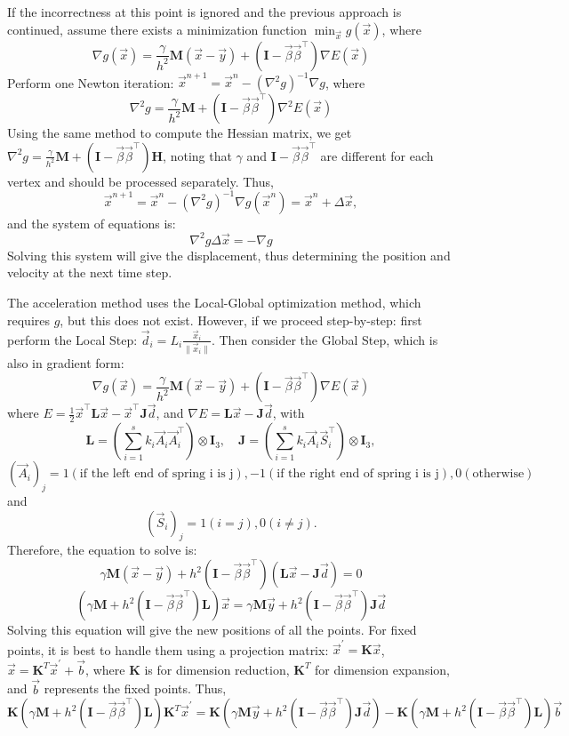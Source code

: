 \documentclass{article}
\begin{document}
If the incorrectness at this point is ignored and the previous approach is continued, assume there exists a minimization function $\min_{\vec{x}} g(\vec{x})$, where
$$ \nabla g(\vec{x}) = \frac{\gamma}{h^2} \mathbf{M}(\vec{x} - \vec{y}) + (\mathbf{I} - \vec{\beta} \vec{\beta}^\top) \nabla E(\vec{x}) $$
Perform one Newton iteration: $ \vec{x}^{n+1} = \vec{x}^n - (\nabla^2 g)^{-1} \nabla g $, where
$$ \nabla^2 g = \frac{\gamma}{h^2} \mathbf{M} + (\mathbf{I} - \vec{\beta} \vec{\beta}^\top) \nabla^2 E(\vec{x}) $$
Using the same method to compute the Hessian matrix, we get $ \nabla^2 g = \frac{\gamma}{h^2} \mathbf{M} + (\mathbf{I} - \vec{\beta} \vec{\beta}^\top) \mathbf{H} $, noting that $\gamma$ and $\mathbf{I} - \vec{\beta} \vec{\beta}^\top$ are different for each vertex and should be processed separately.
Thus, 
$$ \vec{x}^{n+1} = \vec{x}^n - (\nabla^2 g)^{-1} \nabla g (\vec{x}^n) = \vec{x}^n + \Delta \vec{x}, $$
and the system of equations is:
$$ \nabla^2 g \Delta \vec{x} = -\nabla g $$
Solving this system will give the displacement, thus determining the position and velocity at the next time step.

The acceleration method uses the Local-Global optimization method, which requires $g$, but this does not exist. However, if we proceed step-by-step: first perform the Local Step: $ \vec{d}_i = L_i \frac{\vec{x}_i}{\|\vec{x}_i \|} $. Then consider the Global Step, which is also in gradient form:
$$ \nabla g(\vec{x}) = \frac{\gamma}{h^2} \mathbf{M}(\vec{x} - \vec{y}) + (\mathbf{I} - \vec{\beta} \vec{\beta}^\top) \nabla E(\vec{x}) $$
where $E = \frac{1}{2} \vec{x}^\top \mathbf{L}\vec{x} - \vec{x}^\top \mathbf{J} \vec{d} $, and $\nabla E = \mathbf{L} \vec{x} - \mathbf{J} \vec{d}$, with 
$$ \mathbf{L}=\left(\sum_{i=1}^s k_i \vec{A} _ i \vec{A} _ i^{\top}\right) \otimes \mathbf{I} _ 3, \quad \mathbf{J}=\left(\sum_{i=1}^s k_i \vec{A}_i \vec{S}_i^{\top}\right) \otimes \mathbf{I}_3, $$
$$ (\vec{A}_i)_j = 1 (\text{if the left end of spring i is j}), -1 (\text{if the right end of spring i is j}), 0 (\text{otherwise}) $$
and
$$ (\vec{S}_i)_j = 1 (i = j), 0 (i \neq j). $$
Therefore, the equation to solve is:
$$ \gamma \mathbf{M}(\vec{x} - \vec{y}) + h^2 (\mathbf{I} - \vec{\beta} \vec{\beta}^\top) (\mathbf{L} \vec{x} - \mathbf{J} \vec{d}) = 0 $$
$$ (\gamma \mathbf{M} + h^2 (\mathbf{I} - \vec{\beta} \vec{\beta}^\top) \mathbf{L}) \vec{x} = \gamma \mathbf{M} \vec{y} + h^2 (\mathbf{I} - \vec{\beta} \vec{\beta}^\top) \mathbf{J} \vec{d} $$
Solving this equation will give the new positions of all the points. For fixed points, it is best to handle them using a projection matrix: $\vec{x}^{'} = \mathbf{K} \vec{x}$, $\vec{x} = \mathbf{K}^{T} \vec{x}^{'} + \vec{b}$, where $\mathbf{K}$ is for dimension reduction, $\mathbf{K}^{T}$ for dimension expansion, and $\vec{b}$ represents the fixed points. Thus,
$$ \mathbf{K} (\gamma \mathbf{M} + h^2 (\mathbf{I} - \vec{\beta} \vec{\beta}^\top) \mathbf{L}) \mathbf{K}^{T} \vec{x}^{'} = \mathbf{K} (\gamma \mathbf{M} \vec{y} + h^2 (\mathbf{I} - \vec{\beta} \vec{\beta}^\top) \mathbf{J} \vec{d}) - \mathbf{K} (\gamma \mathbf{M} + h^2 (\mathbf{I} - \vec{\beta} \vec{\beta}^\top) \mathbf{L}) \vec{b} $$
\end{document}
